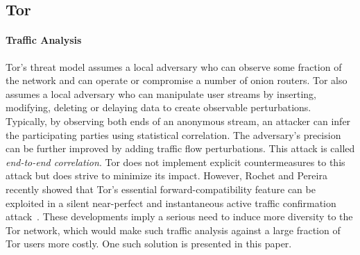 \subsection{Tor}


\paragraph*{Traffic Analysis}
Tor's threat model assumes a local adversary who can observe some fraction of
the network and can operate or compromise a number of onion routers. Tor also
assumes a local adversary who can manipulate user streams by inserting,
modifying, deleting or delaying data to create observable
perturbations. Typically, by observing both ends of an anonymous stream, an
attacker can infer the participating parties using statistical correlation. The
adversary's precision can be further improved by adding traffic flow
perturbations. This attack is called \textit{end-to-end correlation}. Tor does
not implement explicit countermeasures to this attack but does strive to
minimize its impact. However, Rochet and Pereira recently showed that Tor's
essential forward-compatibility feature can be exploited in a silent
near-perfect and instantaneous active traffic confirmation
attack~\cite{rochet2018dropping}. These developments imply a serious need to
induce more diversity to the Tor network, which would make such traffic analysis
against a large fraction of Tor users more costly. One such solution is
presented in this paper.

